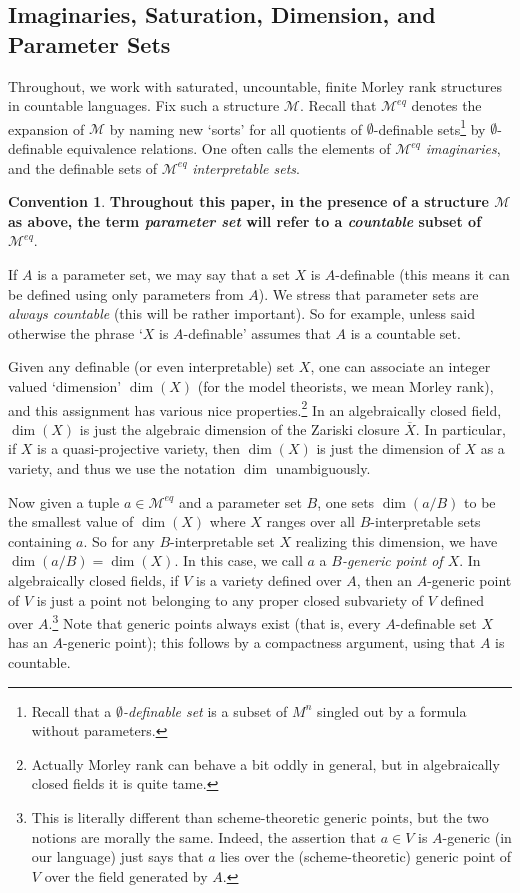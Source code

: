 \documentclass{amsart}
\theoremstyle{definition}
\newtheorem{convention}[theorem]{Convention}
\begin{document}
\subsection{Imaginaries, Saturation, Dimension, and Parameter Sets} Throughout, we work with saturated, uncountable, finite Morley rank structures in countable languages. Fix such a structure $\mathcal M$. Recall that $\mathcal M^{eq}$ denotes the expansion of $\mathcal M$ by naming new `sorts' for all quotients of $\emptyset$-definable sets\footnote{Recall that a \textit{$\emptyset$-definable set} is a subset of $M^n$ singled out by a formula without parameters.} by $\emptyset$-definable equivalence relations. One often calls the elements of $\mathcal M^{eq}$ \textit{imaginaries}, and the definable sets of $\mathcal M^{eq}$ \textit{interpretable sets}.

\begin{convention}
    \textbf{Throughout this paper, in the presence of a structure $\mathcal M$ as above, the term \textit{parameter set} will refer to a \textit{countable} subset of $\mathcal M^{eq}$}. 
\end{convention}

If $A$ is a parameter set, we may say that a set $X$ is $A$-definable (this means it can be defined using only parameters from $A$). We stress that parameter sets are \textit{always countable} (this will be rather important). So for example, unless said otherwise the phrase `$X$ is $A$-definable' assumes that $A$ is a countable set.

Given any definable (or even interpretable) set $X$, one can associate an integer valued `dimension' $\dim(X)$ (for the model theorists, we mean Morley rank), and this assignment has various nice properties.\footnote{Actually Morley rank can behave a bit oddly in general, but in algebraically closed fields it is quite tame.} In an algebraically closed field, $\dim(X)$ is just the algebraic dimension of the Zariski closure $\overline X$. In particular, if $X$ is a quasi-projective variety, then $\dim(X)$ is just the dimension of $X$ as a variety, and thus we use the notation $\dim$ unambiguously.

Now given a tuple $a\in\mathcal M^{eq}$ and a parameter set $B$, one sets $\dim(a/B)$ to be the smallest value of $\dim(X)$ where $X$ ranges over all $B$-interpretable sets containing $a$. So for any $B$-interpretable set $X$ realizing this dimension, we have $\dim(a/B)=\dim(X)$. In this case, we call $a$ a \textit{$B$-generic point of $X$}. In algebraically closed fields, if $V$ is a variety defined over $A$, then an $A$-generic point of $V$ is just a point not belonging to any proper closed subvariety of $V$ defined over $A$.\footnote{This is literally different than scheme-theoretic generic points, but the two notions are morally the same. Indeed, the assertion that $a\in V$ is $A$-generic (in our language) just says that $a$ lies over the (scheme-theoretic) generic point of $V$ over the field generated by $A$.} Note that generic points always exist (that is, every $A$-definable set $X$ has an $A$-generic point); this follows by a compactness argument, using that $A$ is countable.
\end{document}
